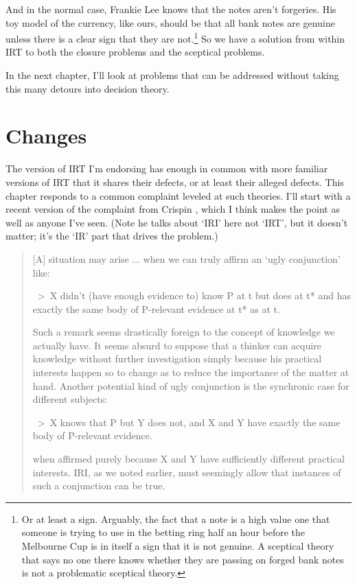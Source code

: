\documentclass[
  11pt,
]{book}
\begin{document}
And in the normal case, Frankie Lee knows that the notes aren't forgeries. His toy model of the currency, like ours, should be that all bank notes are genuine unless there is a clear sign that they are not.\footnote{Or at least a sign. Arguably, the fact that a note is a high value one that someone is trying to use in the betting ring half an hour before the Melbourne Cup is in itself a sign that it is not genuine. A sceptical theory that says no one there knows whether they are passing on forged bank notes is not a problematic sceptical theory.} So we have a solution from within IRT to both the closure problems and the sceptical problems.

In the next chapter, I'll look at problems that can be addressed without taking this many detours into decision theory.

\hypertarget{changes}{%
\chapter{Changes}\label{changes}}

The version of IRT I'm endorsing has enough in common with more familiar versions of IRT that it shares their defects, or at least their alleged defects. This chapter responds to a common complaint leveled at such theories. I'll start with a recent version of the complaint from Crispin \citet{Wright2018}, which I think makes the point as well as anyone I've seen. (Note he talks about `IRI' here not `IRT', but it doesn't matter; it's the `IR' part that drives the problem.)

\begin{quote}
{[}A{]} situation may arise \(\dots\) when we can truly affirm an `ugly conjunction' like:

~\textgreater~X didn't (have enough evidence to) know P at t but does at t* and has exactly the same body of P-relevant evidence at t* as at t.

Such a remark seems drastically foreign to the concept of knowledge we actually have. It seems absurd to suppose that a thinker can acquire knowledge without further investigation simply because his practical interests happen so to change as to reduce the importance of the matter at hand. Another potential kind of ugly conjunction is the synchronic case for different subjects:

~\textgreater~X knows that P but Y does not, and X and Y have exactly the same body of P-relevant evidence.

when affirmed purely because X and Y have sufficiently different practical interests. IRI, as we noted earlier, must seemingly allow that instances of such a conjunction can be true. \citep[ 368]{Wright2018}
\end{quote}
\end{document}
